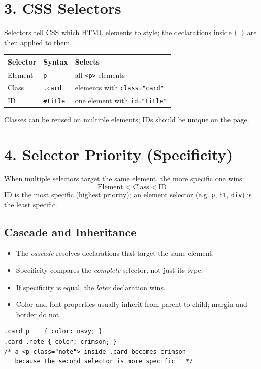 \documentclass[12pt]{article}
\begin{document}
\section{3. CSS Selectors}
Selectors tell CSS which HTML elements to style; the declarations inside \texttt{\{ \}} are then applied to them.

\begin{center}
\begin{tabular}{lll}
\textbf{Selector} & \textbf{Syntax} & \textbf{Selects} \\
\hline
Element & \texttt{p} & all \texttt{<p>} elements \\
Class & \texttt{.card} & elements with \texttt{class="card"} \\
ID & \texttt{\#title} & one element with \texttt{id="title"} \\
\end{tabular}
\end{center}
Classes can be reused on multiple elements; IDs should be unique on the page.

\section{4. Selector Priority (Specificity)}
When multiple selectors target the same element, the more specific one wins:
$$\text{Element} < \text{Class} < \text{ID}$$
ID is the most specific (highest priority); an element selector (e.g. \texttt{p}, \texttt{h1}, \texttt{div}) is the least specific.

\subsection{Cascade and Inheritance}
\begin{itemize}
    \item The \emph{cascade} resolves declarations that target the same element.
    \item Specificity compares the \emph{complete} selector, not just its type.
    \item If specificity is equal, the \emph{later} declaration wins.
    \item Color and font properties usually inherit from parent to child; margin and border do not.
\end{itemize}
\begin{lstlisting}
.card p    { color: navy; }
.card .note { color: crimson; }
/* a <p class="note"> inside .card becomes crimson
   because the second selector is more specific   */
\end{lstlisting}
\end{document}
